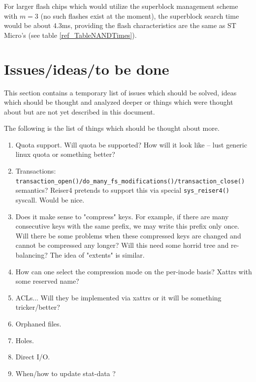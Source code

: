 \documentclass[12pt,a4paper,oneside,titlepage]{article}
\begin{document}
For larger flash chips which would utilize the superblock management scheme
with $m = 3$ (no such flashes exist at the moment), the superblock search time
would be about 4.3ms, providing the flash characteristics are the same as ST
Micro's (see table \ref{ref_TableNANDTimes}).

%
%
\section{Issues/ideas/to be done}

This section contains a temporary list of issues which should be solved, ideas
which should be thought and analyzed deeper or things which were thought about
but are not yet described in this document.

The following is the list of things which should be thought about more.

\begin{enumerate}

\item Quota support. Will quota be supported? How will it look like -- lust
generic linux quota or something better?

\item Transactions:\\
\texttt{transaction\_open()/do\_many\_fs\_modifications()/transaction\_close()}
semantics? Reiser4 pretends to support this via special \texttt{sys\_reiser4()}
syscall. Would be nice.

\item Does it make sense to "compress" keys. For example, if there are many
consecutive keys with the same prefix, we may write this prefix only once. Will
there be some problems when these compressed keys are changed and cannot be
compressed any longer? Will this need some horrid tree and re-balancing?
The idea of "extents" is similar.

\item How can one select the compression mode on the per-inode basis? Xattrs
with some reserved name?

\item ACLs... Will they be implemented via xattrs or it will be something
tricker/better?

\item Orphaned files.

\item Holes.

\item Direct I/O.

\item When/how to update stat-data ?

\end{enumerate}
\end{document}
